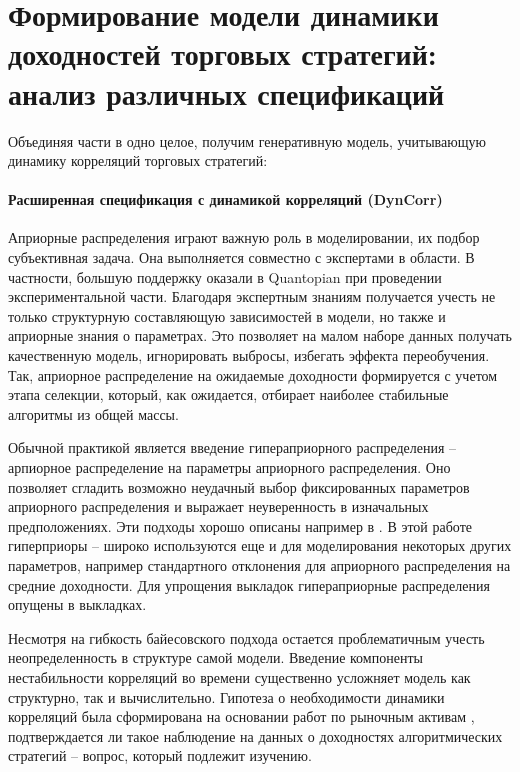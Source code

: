 \section{Формирование модели динамики доходностей торговых стратегий: анализ различных спецификаций}
Объединяя части в одно целое, получим генеративную модель, учитывающую динамику корреляций торговых стратегий:
\paragraph{Расширенная спецификация с динамикой корреляций (DynCorr)}



Априорные распределения играют важную роль в моделировании, их подбор субъективная задача. Она выполняется совместно с экспертами в области. В частности, большую поддержку оказали в Quantopian при проведении экспериментальной части. Благодаря экспертным знаниям получается учесть не только структурную составляющую зависимостей в модели, но также и априорные знания о параметрах. Это позволяет на малом наборе данных получать качественную модель, игнорировать выбросы, избегать эффекта переобучения. Так, априорное распределение на ожидаемые доходности формируется с учетом этапа селекции, который, как ожидается, отбирает наиболее стабильные алгоритмы из общей массы.

Обычной практикой является введение гипераприорного распределения -- арпиорное распределение на параметры априорного распределения. Оно позволяет сгладить возможно неудачный выбор фиксированных параметров априорного распределения и выражает неуверенность в изначальных предположениях. Эти подходы хорошо описаны например в \cite{daniel2014}. В этой работе гиперприоры -- широко используются еще и для моделирования некоторых других параметров, например стандартного отклонения для априорного распределения на средние доходности. Для упрощения выкладок гипераприорные распределения опущены в выкладках.

Несмотря на гибкость байесовского подхода остается проблематичным учесть неопределенность в структуре самой модели. Введение компоненты нестабильности корреляций во времени существенно усложняет модель как структурно, так и вычислительно. Гипотеза о необходимости динамики корреляций была сформирована на основании работ по рыночным активам \citep{vaga1990, oral2017}, подтверждается ли такое наблюдение на данных о доходностях алгоритмических стратегий -- вопрос, который подлежит изучению.

